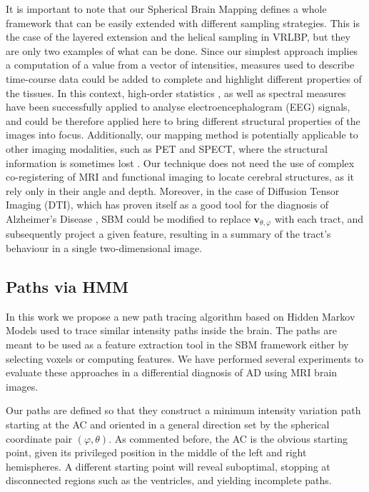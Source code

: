 It is important to note that our Spherical Brain Mapping defines a whole framework that can be easily extended with different sampling strategies. This is the case of the layered extension and the helical sampling in VRLBP, but they are only two examples of what can be done. 
Since our simplest approach implies a computation of a value from a vector of intensities, measures used to describe time-course data could be added to complete and highlight different properties of the tissues. In this context, high-order statistics \cite{Zhou2008}, as well as spectral measures \cite{Locatelli1998} have been successfully applied to analyse electroencephalogram (EEG) signals, and could be therefore applied here to bring different structural properties of the images into focus. 
Additionally, our mapping method is potentially applicable to other imaging modalities, such as PET and SPECT, where the structural information is sometimes lost \cite{IAIllan2010,Ram'irez2009}. Our technique does not need the use of complex co-registering of MRI and functional imaging to locate cerebral structures, as it rely only in their angle and depth. Moreover, in the case of Diffusion Tensor Imaging (DTI), which has proven itself as a good tool for the diagnosis of Alzheimer's Disease \cite{Grana2011,Medina2008}, \ac{SBM} could be modified to replace $\mathbf{v}_{\theta,\varphi}$ with each tract, and subsequently project a given feature, resulting in a summary of the tract's behaviour in a single two-dimensional image. 

			

\subsection{Paths via \ac{HMM}}\label{sec:discussion}
In this work we propose a new path tracing algorithm based on Hidden Markov Models used to trace similar intensity paths inside the brain. The paths are meant to be used as a feature extraction tool in the \ac{SBM} framework either by selecting voxels or computing features. We have performed several experiments to evaluate these approaches in a differential diagnosis of AD using MRI brain images. 

Our paths are defined so that they construct a minimum intensity variation path starting at the AC and oriented in a general direction set by the spherical coordinate pair $(\varphi,\theta)$. As commented before, the AC is the obvious starting point, given its privileged position in the middle of the left and right hemispheres. A different starting point will reveal suboptimal, stopping at disconnected regions such as the ventricles, and yielding incomplete paths. 


